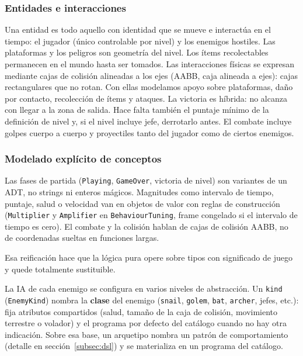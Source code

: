 \subsubsection{Entidades e interacciones}
\label{subsubsec:dominio-entidades}

Una entidad es todo aquello con identidad que se mueve e interactúa en el tiempo: el
jugador (único controlable por nivel) y los enemigos hostiles. Las plataformas y
los peligros son geometría del nivel. Los ítems recolectables permanecen en el mundo
hasta ser tomados. Las
interacciones físicas se expresan mediante cajas de colisión alineadas a los ejes
(AABB, caja alineada a ejes): cajas rectangulares que no rotan. Con ellas
modelamos apoyo sobre plataformas, daño por contacto, recolección de ítems y ataques. La
victoria es híbrida: no alcanza con llegar a la zona de salida. Hace falta
también el puntaje mínimo de la definición de nivel y, si el nivel incluye jefe,
derrotarlo antes. El combate incluye golpes cuerpo a cuerpo y proyectiles tanto del
jugador como de ciertos enemigos.

\subsubsection{Modelado explícito de conceptos}
\label{subsubsec:dominio-modelado}

Las fases de partida
(\texttt{Playing}, \texttt{GameOver}, victoria de nivel) son variantes de un ADT, no
strings ni enteros mágicos. Magnitudes como intervalo de tiempo, puntaje, salud o
velocidad van en objetos de valor con reglas de construcción (\texttt{Multiplier}
y \texttt{Amplifier} en \texttt{BehaviourTuning}, frame congelado si el
intervalo de tiempo es cero). El combate y la colisión hablan de
cajas de colisión AABB, no de coordenadas sueltas en funciones largas.

Esa reificación hace que la lógica pura opere sobre tipos con significado de juego y quede
totalmente sustituible.

La IA de cada enemigo se configura en varios niveles de abstracción. Un
\texttt{kind} (\texttt{EnemyKind}) nombra la \textbf{clase} del enemigo
(\texttt{snail}, \texttt{golem}, \texttt{bat}, \texttt{archer}, jefes, etc.): fija
atributos compartidos (salud, tamaño de la caja de colisión, movimiento terrestre o
volador) y el programa por defecto del catálogo cuando no hay otra indicación. Sobre
esa base, un arquetipo nombra un patrón de comportamiento (detalle en
sección~\ref{subsec:dsl}) y se materializa en un programa del catálogo.

